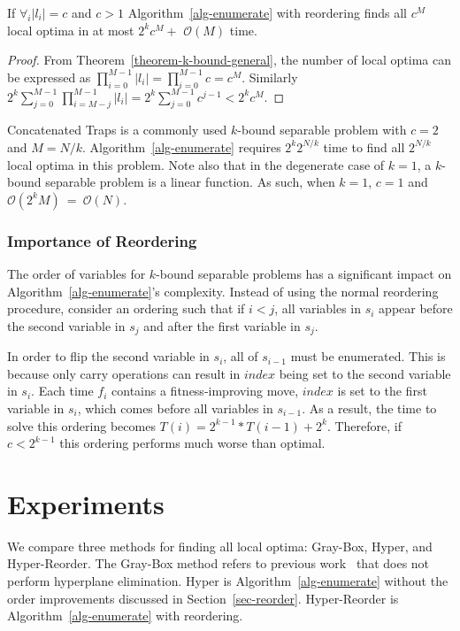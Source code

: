 \documentclass[runningheads,a4paper]{llncs}
\newcommand{\BigO}[1]{$\mathcal{O}{(#1)}$}
\begin{document}
\begin{theorem}
If $\forall_i |l_i| = c$ and $c>1$ Algorithm~\ref{alg-enumerate} with reordering
finds all $c^M$ local optima in at most $2^kc^M + $ \BigO{M} time.
\end{theorem}

\begin{proof}
From Theorem~\ref{theorem-k-bound-general}, the number of local optima can
be expressed as $\prod_{i=0}^{M-1} |l_i| = \prod_{i=0}^{M-1} c = c^M$. Similarly
$2^k\sum_{j=0}^{M-1} \prod_{i=M-j}^{M-1} |l_i| = 2^k\sum_{j=0}^{M-1} c^{j-1} < 2^kc^M$.
\end{proof}


Concatenated Traps is a commonly used $k$-bound separable problem
with $c=2$ and $M=N/k$.  Algorithm~\ref{alg-enumerate} requires $2^k2^{N/k}$ time
to find all $2^{N/k}$ local optima in this problem. Note also that
in the degenerate case of $k=1$, a $k$-bound separable problem
is a linear function. As such, when $k=1$, $c=1$ and
\BigO{2^kM}~=~\BigO{N}.

\subsubsection{Importance of Reordering}
The order of variables for $k$-bound separable problems
has a significant impact on Algorithm~\ref{alg-enumerate}'s complexity.
Instead of using the normal reordering procedure, consider an ordering
such that if $i < j$, all variables in $s_i$ appear before the second variable
in $s_j$ and after the first variable in $s_j$.

In order to flip the second variable in $s_i$, all of $s_{i-1}$ must be enumerated.
This is because only carry operations can result in $index$ being set to the second
variable in $s_i$. Each time $f_i$ contains a fitness-improving move, $index$ is set
to the first variable in $s_i$, which comes before all variables in $s_{i-1}$.
As a result, the time to solve this ordering becomes $T(i) = 2^{k-1}*T(i-1)+2^k$.
Therefore, if $c < 2^{k-1}$ this ordering performs much worse than optimal.

\section{Experiments}
We compare three methods for finding all local optima: Gray-Box, Hyper, and Hyper-Reorder.
The Gray-Box method refers to previous work~\cite{ochoa:2015:crossovernetworks} that does
not perform hyperplane elimination. Hyper is Algorithm~\ref{alg-enumerate} without the order
improvements discussed in Section~\ref{sec-reorder}. Hyper-Reorder is Algorithm~\ref{alg-enumerate} with
reordering.
\end{document}
